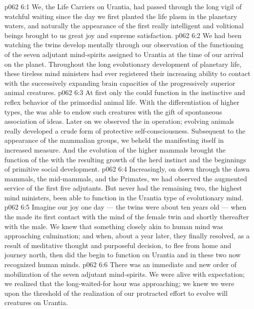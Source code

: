 \vs p062 6:1 We, the Life Carriers on Urantia, had passed through the long vigil of watchful waiting since the day we first planted the life plasm in the planetary waters, and naturally the appearance of the first really intelligent and volitional beings brought to us great joy and supreme satisfaction.
\vs p062 6:2 We had been watching the twins develop mentally through our observation of the functioning of the seven adjutant mind\hyp{}spirits assigned to Urantia at the time of our arrival on the planet. Throughout the long evolutionary development of planetary life, these tireless mind ministers had ever registered their increasing ability to contact with the successively expanding brain capacities of the progressively superior animal creatures.
\vs p062 6:3 At first only the  could function in the instinctive and reflex behavior of the primordial animal life. With the differentiation of higher types, the  was able to endow such creatures with the gift of spontaneous association of ideas. Later on we observed the  in operation; evolving animals really developed a crude form of protective self\hyp{}consciousness. Subsequent to the appearance of the mammalian groups, we beheld the  manifesting itself in increased measure. And the evolution of the higher mammals brought the function of the  with the resulting growth of the herd instinct and the beginnings of primitive social development.
\vs p062 6:4 Increasingly, on down through the dawn mammals, the mid\hyp{}mammals, and the Primates, we had observed the augmented service of the first five adjutants. But never had the remaining two, the highest mind ministers, been able to function in the Urantia type of evolutionary mind.
\vs p062 6:5 Imagine our joy one day --- the twins were about ten years old --- when the  made its first contact with the mind of the female twin and shortly thereafter with the male. We knew that something closely akin to human mind was approaching culmination; and when, about a year later, they finally resolved, as a result of meditative thought and purposeful decision, to flee from home and journey north, then did the  begin to function on Urantia and in these two now recognized human minds.
\vs p062 6:6 There was an immediate and new order of mobilization of the seven adjutant mind\hyp{}spirits. We were alive with expectation; we realized that the long\hyp{}waited\hyp{}for hour was approaching; we knew we were upon the threshold of the realization of our protracted effort to evolve will creatures on Urantia.
